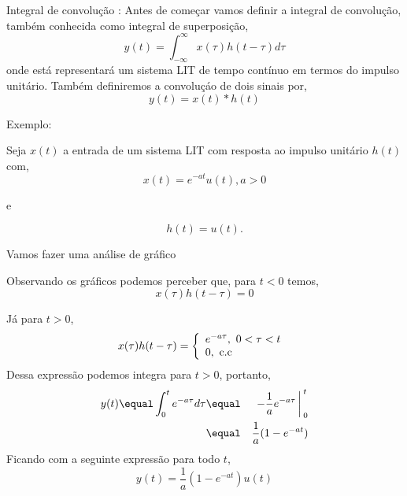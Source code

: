 \documentclass[9pt]{beamer}
\begin{document}
\begin{frame}{Integral  de convolu\c{c}\~{a}o :}
  \justifying
  Antes de come\c{c}ar vamos definir a integral de convolu\c{c}\~{a}o, tamb\'{e}m conhecida como integral de superposi\c{c}\~{a}o,
  $$ y(t) = \int_{-\infty}^{\infty} x(\tau)h(t - \tau)d \tau$$
  onde est\'{a} representar\'{a}  um sistema  LIT de tempo cont\'{i}nuo em termos do impulso unit\'{a}rio.  Tamb\'{e}m definiremos a convolu\c{c}\'{a}o de dois sinais por,
  $$ y(t) = x(t) * h(t)$$ 
  \par
  Exemplo:
  \par
  Seja $x(t)$ a entrada de um sistema LIT com resposta ao impulso unit\'{a}rio $h(t)$ com,
  $$ x(t) = e^{-at} u(t), a > 0$$
  \par
  e
  \par
  $$ h(t) = u(t).$$
\end{frame}
\begin{frame}
  Vamos fazer uma an\'{a}lise de gr\'{a}fico 
  \begin{figure}[!htb]
  \end{figure}
\end{frame}
\begin{frame}
  \begin{figure}[!htpb]
  \end{figure}
\end{frame}
\begin{frame}
  Observando os gr\'{a}ficos podemos perceber que, para $ t < 0 $ temos,
  $$ x( \tau )h(t - \tau) = 0$$
  \par
  J\'{a} para $ t > 0 $,
  \begin{displaymath}
    x(\tau)h( t - \tau) = \left \{\begin{array}{ll}
      e^{-a \tau},  \textrm { $ 0 < \tau < t $ } \\
      0, \textrm { c.c}
    \end{array} \right.
  \end{displaymath}
  Dessa express\~{a}o podemos integra para $ t > 0$, portanto,
  \begin{eqnarray}
    y(t) \equal \int_{0}^{t} e^{-a \tau} d \tau  & \equal & -\frac {1} {a} e^{-a \tau} \bigg \arrowvert_{0}^{t} \nonumber \\
    & \equal & \frac {1} {a} (1 - e^{-at}) \nonumber
  \end{eqnarray}
  Ficando com  a seguinte express\~{a}o para todo $ t $,
  $$ y(t) \equal  \frac {1} {a} (1 - e^{-at}) u(t) $$
\end{frame}
\end{document}
